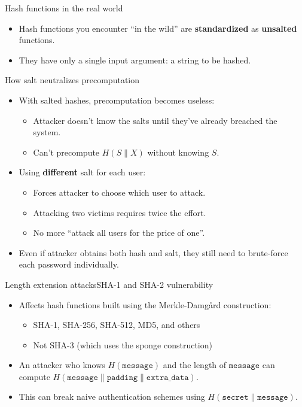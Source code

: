\documentclass[aspectratio=169, lualatex, handout]{beamer}
\begin{document}
\begin{frame}{Hash functions in the real world}
	\begin{itemize}[<+->]
		\item Hash functions you encounter ``in the wild'' are \textbf{standardized} as \textbf{unsalted} functions.
		\item They have only a single input argument: a string to be hashed.
	\end{itemize}
\end{frame}

\begin{frame}{How salt neutralizes precomputation}
	\begin{itemize}[<+->]
		\item With salted hashes, precomputation becomes useless:
		      \begin{itemize}
			      \item Attacker doesn't know the salts until they've already breached the system.
			      \item Can't precompute $H(S \| X)$ without knowing $S$.
		      \end{itemize}
		\item Using \textbf{different} salt for each user:
		      \begin{itemize}
			      \item Forces attacker to choose which user to attack.
			      \item Attacking two victims requires twice the effort.
			      \item No more ``attack all users for the price of one''.
		      \end{itemize}
		\item Even if attacker obtains both hash and salt, they still need to brute-force each password individually.
	\end{itemize}
\end{frame}

\begin{frame}{Length extension attacks}{SHA-1 and SHA-2 vulnerability}
	\begin{itemize}[<+->]
		\item Affects hash functions built using the Merkle-Damgård construction:
		      \begin{itemize}
			      \item SHA-1, SHA-256, SHA-512, MD5, and others
			      \item Not SHA-3 (which uses the sponge construction)
		      \end{itemize}
		\item An attacker who knows $H(\texttt{message})$ and the length of $\texttt{message}$ can compute $H(\texttt{message} \| \texttt{padding} \| \texttt{extra\_data})$.
		\item This can break naive authentication schemes using $H(\texttt{secret} \| \texttt{message})$.
	\end{itemize}
\end{frame}
\end{document}
